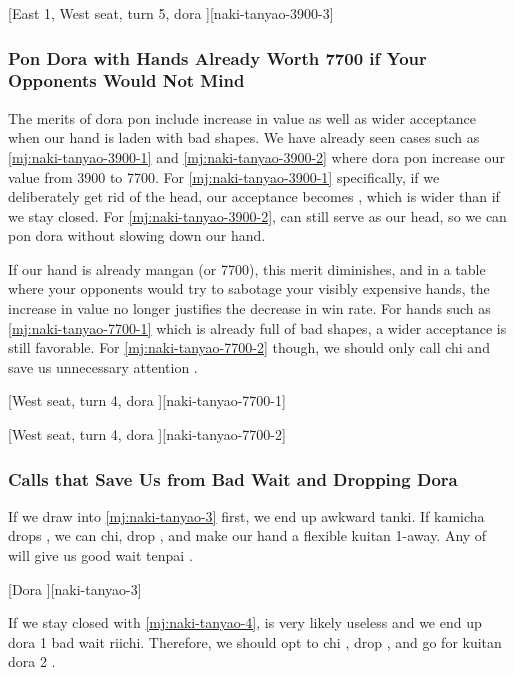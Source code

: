 \documentclass[12pt]{article}
\begin{document}
[East 1, West seat, turn 5, dora ][naki-tanyao-3900-3]


\subsubsection*{Pon Dora with Hands Already Worth 7700 if Your Opponents Would Not Mind}

The merits of dora pon include increase in value as well as wider acceptance when our hand is laden with bad shapes. We have already seen cases such as \ref{mj:naki-tanyao-3900-1} and \ref{mj:naki-tanyao-3900-2} where dora pon increase our value from 3900 to 7700. For \ref{mj:naki-tanyao-3900-1} specifically, if we deliberately get rid of the head, our acceptance becomes , which is wider than  if we stay closed. For \ref{mj:naki-tanyao-3900-2},  can still serve as our head, so we can pon dora  without slowing down our hand.

If our hand is already mangan (or 7700), this merit diminishes, and in a table where your opponents would try to sabotage your visibly expensive hands, the increase in value no longer justifies the decrease in win rate. For hands such as \ref{mj:naki-tanyao-7700-1} which is already full of bad shapes, a wider acceptance is still favorable. For \ref{mj:naki-tanyao-7700-2} though, we should only call  chi and save us unnecessary attention \citep[][pp.~188--195]{tetsusenryaku}.

[West seat, turn 4, dora ][naki-tanyao-7700-1]

[West seat, turn 4, dora ][naki-tanyao-7700-2]


\subsubsection*{Calls that Save Us from Bad Wait and Dropping Dora}

If we draw  into \ref{mj:naki-tanyao-3} first, we end up awkward tanki. If kamicha drops , we can chi, drop , and make our hand a flexible kuitan 1-away. Any of  will give us good wait tenpai \citep{nemata-133}.

[Dora ][naki-tanyao-3]

If we stay closed with \ref{mj:naki-tanyao-4},  is very likely useless and we end up dora 1 bad wait riichi. Therefore, we should opt to chi , drop , and go for kuitan dora 2 \citep{nemata-133}.
\end{document}
